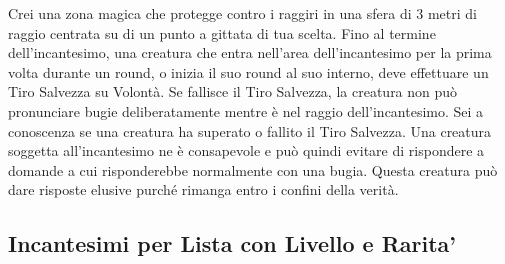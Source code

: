\begin{multicols}{2}
Crei una zona magica che protegge contro i raggiri in una sfera di 3 metri di raggio centrata su di un punto a gittata di tua scelta. Fino al termine dell'incantesimo, una creatura che entra nell'area dell'incantesimo per la prima volta durante un round, o inizia il suo round al suo interno, deve effettuare un Tiro Salvezza su Volontà. Se fallisce il Tiro Salvezza, la creatura non può pronunciare bugie deliberatamente mentre è nel raggio dell'incantesimo. Sei a conoscenza se una creatura ha superato o fallito il Tiro Salvezza. Una creatura soggetta all'incantesimo ne è consapevole e può quindi evitare di rispondere a domande a cui risponderebbe normalmente con una bugia. Questa creatura può dare risposte elusive purché rimanga entro i confini della verità.


\bigskip


\end{multicols}





\pagebreak

\subsection{Incantesimi per Lista con Livello e Rarita'}\hypertarget{elencoscuole}{}

